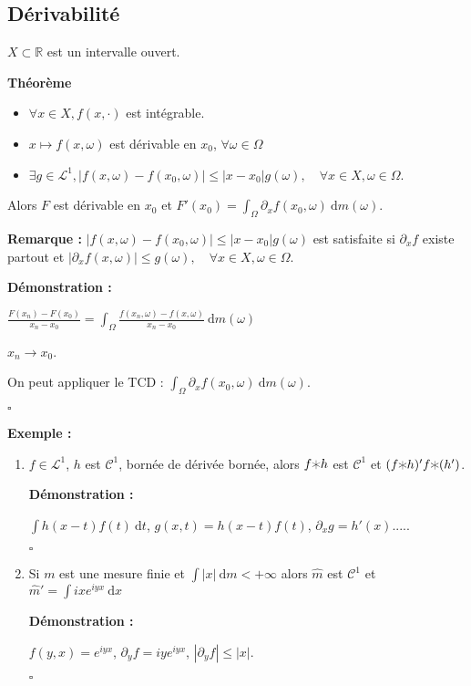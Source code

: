 \documentclass[10pt,a4paper,notitlepage ]{report}
\newcommand{\R}{\mathbb R}
\newcommand{\dd}{\ \mathrm d}
\newcommand{\1}{\mathds 1}
\newcommand{\LL}{\mathcal L}
\newcounter{th}
\newenvironment{theorem}[1][]{
\refstepcounter{th}
\begin{tcolorbox}
	\textbf{Théorème \theth \ #1}
	
	
}{\end{tcolorbox}}
\newenvironment{demo}[1][]{

	\textbf{Démonstration #1 :}
}{\begin{flushright}
	$\square$
\end{flushright}
}
\newenvironment{exemple}{
	
	\textbf{Exemple :} }{}
\newenvironment{rem}{
	
		\textbf{Remarque :}}{}
\begin{document}
\subsection{Dérivabilité}
$X\subset \R$ est un intervalle ouvert.
\begin{theorem}
	\begin{itemize}
		\item $\forall x\in X, f(x,\cdot)$ est intégrable.
		\item $x\mapsto f(x,\omega)$ est dérivable en $x_0$, $\forall \omega\in\Omega$
		\item $\exists g\in \LL^1, |f(x,\omega)-f(x_0,\omega)| \le |x-x_0|g(\omega), \quad \forall x\in X, \omega \in \Omega$.
	\end{itemize}
	Alors $F$ est dérivable en $x_0$ et $F'(x_0) = \int_\Omega\partial_xf(x_0,\omega)\dd m(\omega)$.
\end{theorem}
\begin{rem}
	$|f(x,\omega)-f(x_0,\omega)|\le |x-x_0|g(\omega)$ est satisfaite si $\partial_xf$ existe partout et $|\partial_xf(x,\omega)|\le g(\omega), \quad \forall x\in X, \omega \in \Omega$.
\end{rem}
\begin{demo}
	$\frac{F(x_n)-F(x_0)}{x_n-x_0} = \int_\Omega \frac{f(x_n,\omega)-f(x,\omega)}{x_n-x_0} \dd m(\omega)$
	
	$x_n \rightarrow x_0$.
	
	On peut appliquer le TCD : $\int_\Omega \partial_x f(x_0,\omega)\dd m(\omega)$.
\end{demo}

\begin{exemple}
	\begin{enumerate}
		\item $f\in \LL^1$, $h$ est $\mathcal C^1$, bornée de dérivée bornée, alors $f\varhexstar h$ est $\mathcal C^1$ et $(f\varhexstar h)'f\varhexstar (h')$.
		\begin{demo}
			$\int h(x-t)f(t)\dd t$, $g(x,t)=h(x-t)f(t)$, $\partial_x g = h'(x).....$
		\end{demo}
		\item Si $m$ est une mesure finie et $\int |x| \dd m < +\infty$ alors $\hat m$ est $\mathcal C^1$ et $\hat m' = \int ixe^{iyx}\dd x$
		\begin{demo}
			$f(y,x) = e^{iyx}$, $\partial_y f = iye^{iyx}$, $|\partial_y f| \le |x|$.
		\end{demo}
	\end{enumerate}
\end{exemple}
\end{document}
